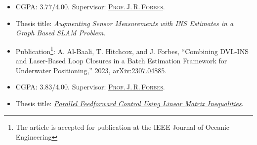 \documentclass[10pt,letter]{altacv}
\begin{document}
\tagline{}


\begin{fullwidth}
\makecvheader
\end{fullwidth}


\begin{itemize}
\item CGPA: 3.77/4.00. Supervisor: \href{https://www.mcgill.ca/mecheng/james-forbes}{\textsc{Prof.\,J.\,R.\,Forbes}}.
\item Thesis title: \emph{Augmenting Sensor Measurements with INS Estimates in a Graph Based SLAM Problem}.
\item Publication\footnote{The article is accepted for publication at the IEEE Journal of Oceanic Engineering}: A. Al-Baali, T. Hitchcox, and J. Forbes, ``Combining DVL-INS and Laser-Based Loop Closures in a Batch Estimation Framework for Underwater Positioning,'' 2023, \href{https://arxiv.org/abs/2307.04885}{arXiv:2307.04885}.
\end{itemize}

\divider

\begin{itemize}
\item CGPA: 3.83/4.00. Supervisor: \href{https://www.mcgill.ca/mecheng/james-forbes}{\textsc{Prof.\,J.\,R.\,Forbes}}.
\item Thesis title: \emph{\href{https://escholarship.mcgill.ca/concern/papers/9p290g61r}{Parallel Feedforward Control Using Linear Matrix Inequalities}}.
\end{itemize}
\end{document}
